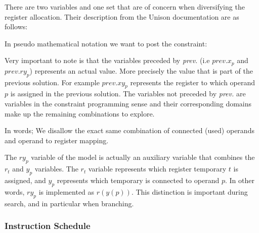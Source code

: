 There are two variables and one set that are of concern when diversifying the register
allocation. Their description from the Unison documentation are as follows:

\vspace{0.2cm}

\noindent{}

\vspace{0.2cm}

In pseudo mathematical notation we want to post the constraint:

\vspace{0.2cm}
\noindent{}
\vspace{0.2cm}

Very important to note is that the variables preceded by \textit{prev.} (i.e $prev.x_p$ and
$prev.ry_p$) represents an actual value. More precisely the value that is part of the previous
solution. For example $prev.xy_p$ represents the register to which operand $p$ is assigned
in the previous solution. The variables not preceded by \textit{prev.} are variables in
the constraint programming sense and their corresponding domains make up the remaining
combinations to explore.

In words; We disallow the exact same combination of connected (used) operands and
operand to register mapping.

The $ry_p$ variable of the model is actually an auxiliary variable that combines the
$r_t$ and $y_p$ variables. The $r_t$ variable represents which register temporary $t$ is
assigned, and $y_p$ represents which temporary is connected to operand $p$. In other words,
$ry_p$ is implemented as $r(y(p))$. This distinction is important during search, and in
particular when branching.

\subsubsection{Instruction Schedule}

